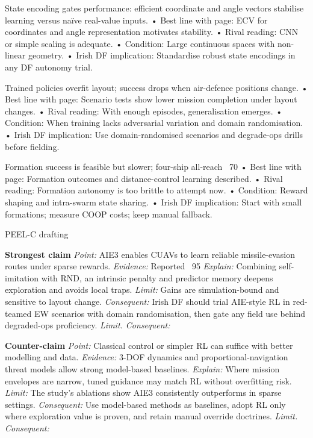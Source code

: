 State encoding gates performance: efficient coordinate and angle vectors stabilise learning versus naïve real-value inputs.
• Best line with page: ECV for coordinates and angle representation motivates stability.
• Rival reading: CNN or simple scaling is adequate.
• Condition: Large continuous spaces with non-linear geometry.
• Irish DF implication: Standardise robust state encodings in any DF autonomy trial.

Trained policies overfit layout; success drops when air-defence positions change.
• Best line with page: Scenario tests show lower mission completion under layout changes.
• Rival reading: With enough episodes, generalisation emerges.
• Condition: When training lacks adversarial variation and domain randomisation.
• Irish DF implication: Use domain-randomised scenarios and degrade-ops drills before fielding.

Formation success is feasible but slower; four-ship all-reach ~70%
• Best line with page: Formation outcomes and distance-control learning described.
• Rival reading: Formation autonomy is too brittle to attempt now.
• Condition: Reward shaping and intra-swarm state sharing.
• Irish DF implication: Start with small formations; measure COOP costs; keep manual fallback.

PEEL-C drafting

\textbf{Strongest claim}
\textit{Point:} AIE3 enables CUAVs to learn reliable missile-evasion routes under sparse rewards.
\textit{Evidence:} Reported ~95%
\textit{Explain:} Combining self-imitation with RND, an intrinsic penalty and predictor memory deepens exploration and avoids local traps.
\textit{Limit:} Gains are simulation-bound and sensitive to layout change.
\textit{Consequent:} Irish DF should trial AIE-style RL in red-teamed EW scenarios with domain randomisation, then gate any field use behind degraded-ops proficiency. \textit{Limit. Consequent:}

\textbf{Counter-claim}
\textit{Point:} Classical control or simpler RL can suffice with better modelling and data.
\textit{Evidence:} 3-DOF dynamics and proportional-navigation threat models allow strong model-based baselines.
\textit{Explain:} Where mission envelopes are narrow, tuned guidance may match RL without overfitting risk.
\textit{Limit:} The study’s ablations show AIE3 consistently outperforms in sparse settings.
\textit{Consequent:} Use model-based methods as baselines, adopt RL only where exploration value is proven, and retain manual override doctrines. \textit{Limit. Consequent:}


